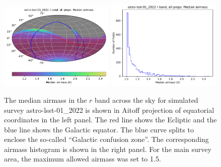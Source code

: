\documentclass[DM,lsstdraft,authoryear,toc]{lsstdoc}
\begin{document}
\begin{figure}[ht]
\centering
\includegraphics[width=0.49\textwidth]{figures/astro-lsst-01_2022_Median_airmass_r_band_all_props_OPSI_SkyMap}
\includegraphics[width=0.49\textwidth]{figures/astro-lsst-01_2022_Median_airmass_r_band_all_props_OPSI_Histogram}
\caption{The median airmass in the $r$ band across the sky for simulated survey
astro-lsst-01\_2022 is shown in Aitoff projection of equatorial coordinates
in the left panel. The red line shows the Ecliptic and the blue line shows the Galactic
equator. The blue curve splits to enclose the so-called ``Galactic confusion zone''. The corresponding
airmass histogram is shown in the right panel. For the main survey area, the maximum
allowed airmass was set to 1.5. }
\label{fig:baseline_airmass}
\end{figure}
\end{document}
